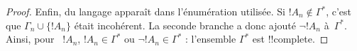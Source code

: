 \documentclass[../../../include/open-logic-section]{subfiles}
\begin{document}
\begin{proof}
Enfin,  du langage apparaît dans l'énumération
utilisée. Si $!A_n\notin\Gamma^*$, c'est que
$\Gamma_n\cup\{!A_n\}$ était incohérent. La seconde branche a
donc ajouté $\lnot !A_n$ à~$\Gamma^*$. Ainsi, pour ~$!A_n$, $!A_n\in\Gamma^*$ ou
$\lnot !A_n\in\Gamma^*$ : l'ensemble $\Gamma^*$ est
!!{complete}.
\end{proof}
\end{document}
